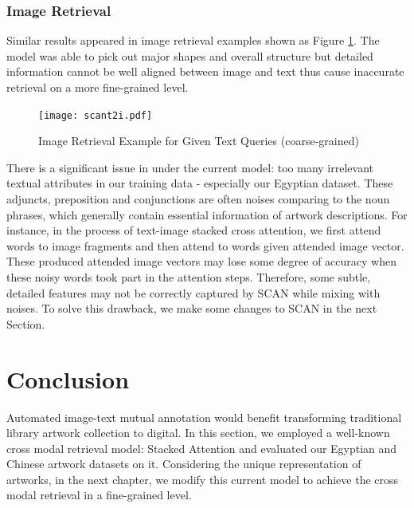 \subsubsection{Image Retrieval}
Similar results appeared in image retrieval examples shown as Figure \ref{fig:scant2i}. The model was able to pick out major shapes and overall structure but detailed information cannot be well aligned between image and text thus cause inaccurate retrieval on a more fine-grained level.

\begin{figure}[h!]
\centering
\texttt{[image: scant2i.pdf]}
\caption{Image Retrieval Example for Given Text Queries (coarse-grained)}
\label{fig:scant2i}
\end{figure}

There is a significant issue in under the current model: too many irrelevant textual attributes in our training data - especially our Egyptian dataset. These adjuncts, preposition and conjunctions are often noises comparing to the noun phrases, which generally contain essential information of artwork descriptions. For instance, in the process of text-image stacked cross attention, we first attend words to image fragments and then attend to words given attended image vector. These produced attended image vectors may lose some degree of accuracy when these noisy words took part in the attention steps. Therefore, some subtle, detailed features may not be correctly captured by SCAN while mixing with noises. To solve this drawback, we make some changes to SCAN in the next Section.


\section{Conclusion}
Automated image-text mutual annotation would benefit transforming traditional library artwork collection to digital. In this section, we employed a well-known cross modal retrieval model: Stacked Attention and evaluated our Egyptian and Chinese artwork datasets on it. Considering the unique representation of artworks, in the next chapter, we modify this current model to achieve the cross modal retrieval in a fine-grained level.


